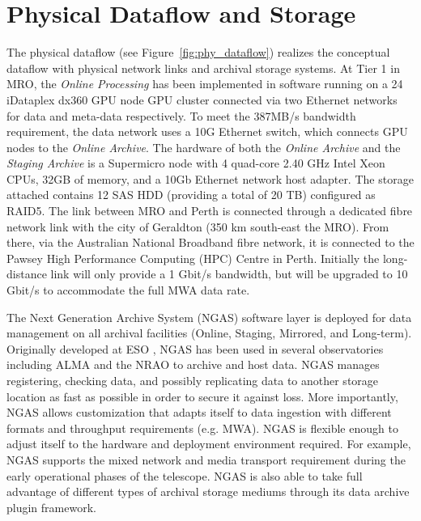 \section{Physical Dataflow and Storage}
The physical dataflow (see Figure~\ref{fig:phy_dataflow}) realizes the conceptual dataflow with physical network links and archival storage systems. At Tier 1 in MRO, the \emph{Online Processing} has been implemented in software running on a 24 iDataplex dx360 GPU node GPU cluster connected via two Ethernet networks for data and meta-data respectively. To meet the 387MB/s bandwidth requirement, the data network uses a 10G Ethernet switch, which connects GPU nodes to the \emph{Online Archive}. The hardware of both the \emph{Online Archive} and the \emph{Staging Archive} is a Supermicro node with 4 quad-core 2.40 GHz Intel Xeon CPUs, 32GB of memory, and a 10Gb Ethernet network host adapter. The storage attached contains 12 SAS HDD (providing a total of 20 TB) configured as RAID5. The link between MRO and Perth is connected through a dedicated fibre network link with the city of Geraldton (350 km south-east the MRO). From there, via the Australian National Broadband fibre network, it is connected to the Pawsey High Performance Computing (HPC) Centre in Perth. Initially the long-distance link will only provide a 1 Gbit/s bandwidth, but will be upgraded to 10 Gbit/s to accommodate the full MWA data rate.

The Next Generation Archive System (NGAS) software layer is deployed for data management on all archival facilities (Online, Staging, Mirrored, and Long-term). Originally developed at ESO \citep{wicenec2007eso}, NGAS has been used in several observatories including ALMA \citep{wicenec2004alma} and the NRAO to archive and host data. NGAS manages registering, checking data, and possibly replicating data to another storage location as fast as possible in order to secure it against loss. More importantly, NGAS allows customization that adapts itself to data ingestion with different formats and throughput requirements (e.g. MWA). NGAS is flexible enough to adjust itself to the hardware and deployment environment required. For example, NGAS supports the mixed network and media transport requirement during the early operational phases of the telescope. NGAS is also able to take full advantage of different types of archival storage mediums through its data archive plugin framework.

